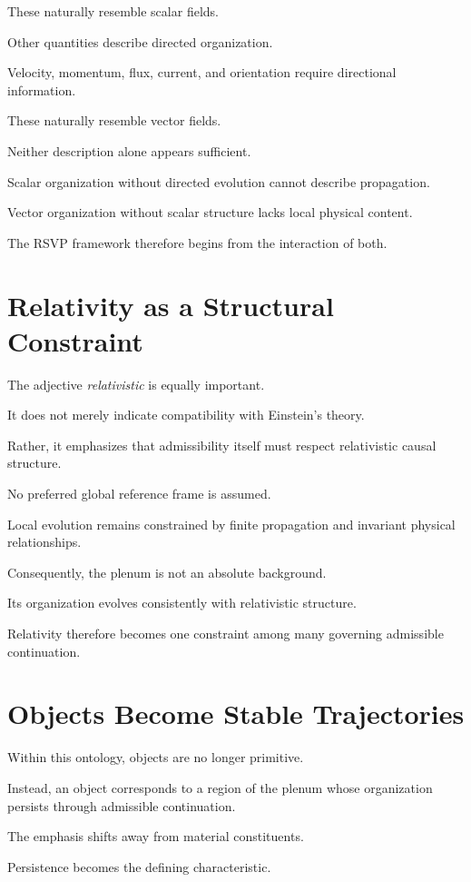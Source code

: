 \documentclass[11pt,oneside]{book}
\numberwithin{equation}{chapter}
\theoremstyle{definition}
\theoremstyle{plain}
\begin{document}
These naturally resemble scalar fields.

Other quantities describe directed organization.

Velocity, momentum, flux, current, and orientation require directional
information.

These naturally resemble vector fields.

Neither description alone appears sufficient.

Scalar organization without directed evolution cannot describe propagation.

Vector organization without scalar structure lacks local physical content.

The RSVP framework therefore begins from the interaction of both.

\section{Relativity as a Structural Constraint}

The adjective \emph{relativistic} is equally important.

It does not merely indicate compatibility with Einstein's theory.

Rather, it emphasizes that admissibility itself must respect relativistic
causal structure.

No preferred global reference frame is assumed.

Local evolution remains constrained by finite propagation and invariant
physical relationships.

Consequently, the plenum is not an absolute background.

Its organization evolves consistently with relativistic structure.

Relativity therefore becomes one constraint among many governing admissible
continuation.

\section{Objects Become Stable Trajectories}

Within this ontology, objects are no longer primitive.

Instead, an object corresponds to a region of the plenum whose organization
persists through admissible continuation.

The emphasis shifts away from material constituents.

Persistence becomes the defining characteristic.
\end{document}
